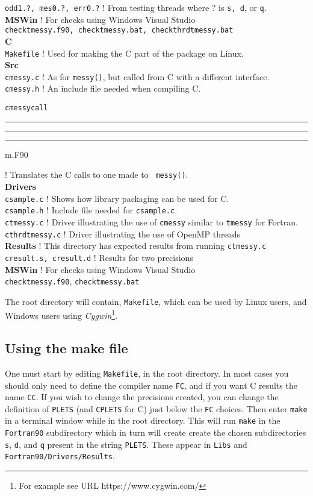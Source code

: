 \documentclass[12pt]{article}
\DeclareRobustCommand{\us}{\rule{.2pt}{0pt}\rule[-.8pt]{.4em}{.5pt}%
  \rule{.2pt}{0pt}}
\DeclareRobustCommand{\us}{\rule{.2pt}{0pt}\rule[-.8pt]{.4em}{.5pt}%
  \rule{.2pt}{0pt}}
\begin{document}
\begin{tabbing}
  {\tt odd1.?, mes0.?, err0.?} ! From testing threads where ? is {\tt s, d},
  or {\tt q}.\-\-\\
  {\bf MSWin} ! For checks using Windows Visual Studio\+\\
  {\tt checktmessy.f90, checktmessy.bat, checkthrdtmessy.bat}\-\-\\
  {\bf C}\+\\
  {\tt Makefile} ! Used for making the C part of the package on Linux.\\
  {\bf Src}\+\\
  {\tt cmessy.c} ! As for {\tt messy()}, but called from C with a different
  interface.\\
  {\tt cmessy.h} ! An include file needed when compiling C.\\
  {\tt cmessycall\us m.F90} ! Translates the C calls to one made to {\tt
    messy()}.\-\\
  {\bf Drivers}\+\\
  {\tt csample.c} ! Shows how library packaging can be used for C.\\
  {\tt csample.h} ! Include file needed for {\tt csample.c}.\\
  {\tt ctmessy.c} ! Driver illustrating the use of {\tt cmessy} similar to
  {\tt tmessy} for Fortran.\\
  {\tt cthrdtmessy.c} ! Driver illustrating the use of OpenMP threads\\
  {\bf Results} ! This directory has expected results from running {\tt ctmessy.c}\+\\
  {\tt cresult.s, cresult.d} ! Results for two precisions\-\-\\
  {\bf MSWin} ! For checks using Windows Visual Studio\+\+\\
  {\tt checktmessy.f90}, {\tt checktmessy.bat}\-\\
\end{tabbing}

The root directory will contain, {\tt Makefile},  which can be used by
Linux users, and Windows users using {\it Cygwin}\footnote{ For example see  URL
  https://www.cygwin.com/}.

\subsection{Using the make file}
\label{sec:using-makefile}

One must start by editing {\tt Makefile}, in the root directory.  In most cases
you should only need to define the compiler name {\tt FC}, and if you want C
results the name {\tt CC}.  If you wish to change the precisions created, you
can change the definition of {\tt PLETS} (and {\tt CPLETS} for C) just below the
{\tt FC} choices.  Then enter {\tt make} in a terminal window while in the root
directory.  This will run {\tt make} in the {\tt Fortran90} subdirectory which in
turn will create create the chosen subdirectories {\tt s}, {\tt d}, and {\tt q}
present in the string {\tt PLETS}.  These appear in {\tt Libs} and {\tt
  Fortran90/Drivers/Results}.
\end{document}
